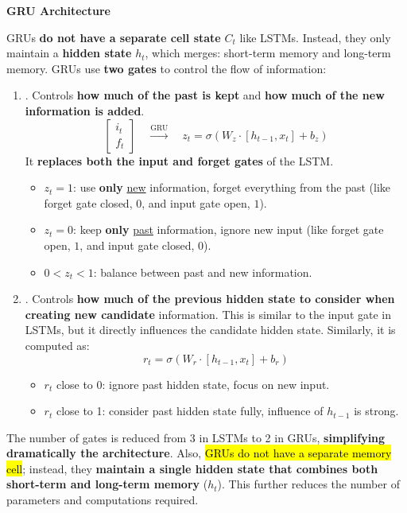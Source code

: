 \highspace
\begin{flushleft}
    \textcolor{Green3}{ \textbf{GRU Architecture}}
\end{flushleft}
GRUs \textbf{do not have a separate cell state} $C_t$ like LSTMs. Instead, they only maintain a \textbf{hidden state} $h_t$, which merges: short-term memory and long-term memory. GRUs use \textbf{two gates} to control the flow of information:
\begin{enumerate}
    \item {}. Controls \textbf{how much of the past is kept} and \textbf{how much of the new information is added}.
    \begin{equation}
        \begin{bmatrix}
            i_t \\
            f_t
        \end{bmatrix}
        \quad \xrightarrow{\text{GRU}} \quad
        z_t = \sigma(W_z \cdot [h_{t-1}, x_t] + b_z)
    \end{equation}
    It \textbf{replaces both the input and forget gates} of the LSTM.
    \begin{itemize}
        \item $z_t = 1$: use \textbf{only} \underline{new} information, forget everything from the past (like forget gate closed, $0$, and input gate open, $1$).
        \item $z_t = 0$: keep \textbf{only} \underline{past} information, ignore new input (like forget gate open, $1$, and input gate closed, $0$).
        \item $0 < z_t < 1$: balance between past and new information.
    \end{itemize}


    \item {}. Controls \textbf{how much of the previous hidden state to consider when creating new candidate} information. This is similar to the input gate in LSTMs, but it directly influences the candidate hidden state. Similarly, it is computed as:
    \begin{equation}
        r_t = \sigma(W_r \cdot [h_{t-1}, x_t] + b_r)
    \end{equation}
    \begin{itemize}
        \item $r_t$ close to 0: ignore past hidden state, focus on new input.
        \item $r_t$ close to 1: consider past hidden state fully, influence of $h_{t-1}$ is strong.
    \end{itemize}
\end{enumerate}
The number of gates is reduced from 3 in LSTMs to 2 in GRUs, \textbf{simplifying dramatically the architecture}. Also, \hl{GRUs do not have a separate memory cell}; instead, they \textbf{maintain a single hidden state that combines both short-term and long-term memory} ($h_t$). This further reduces the number of parameters and computations required.

